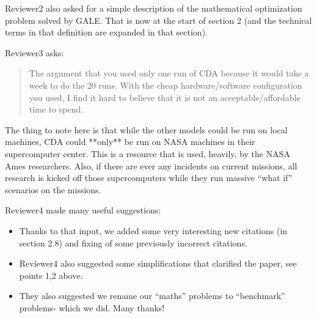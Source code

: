 \documentclass[10pt,journal,compsoc]{IEEEtran}
\newcommand{\bi}{\begin{itemize}}
\newcommand{\ei}{\end{itemize}}
\begin{document}
Reviewer2 also asked for a simple description of the mathematical optimization problem solved by GALE. That is now at the start of section 2 (and the technical terms in that definition are expanded in that section).

Reviewer3 asks: 
\begin{quote}The argument that you used only one run of CDA because it would take a week to do the 20 runs. With the cheap hardware/software configuration you used, I find it hard to believe that it is not an acceptable/affordable time to spend.
\end{quote}
The thing to note here is that while the other models could be run on local machines, CDA could **only** be run on NASA machines in their supercomputer center. This is a resource that is used, heavily, by the NASA Ames researchers. Also, if there are ever any incidents on current missions, all research is kicked off those supercomputers while they run massive “what if” scenarios on the missions. 

Reviewer4 made many useful suggestions: 
\bi
\item
Thanks to that input, we added some very interesting new citations (in section 2.8) and fixing of some previously incorrect citations.
\item
Reviewer4 also suggested some simplifications that clarified the paper, see points 1,2 above.
\item
They  also suggested we rename our “maths” problems to “benchmark” problems- which we did. Many thanks!
\ei



\newpage

\onecolumn
 \setcounter{page}{1}

\renewcommand\thefigure{\thesection.\arabic{figure}}   
\setcounter{figure}{0}    

\appendix
\end{document}
